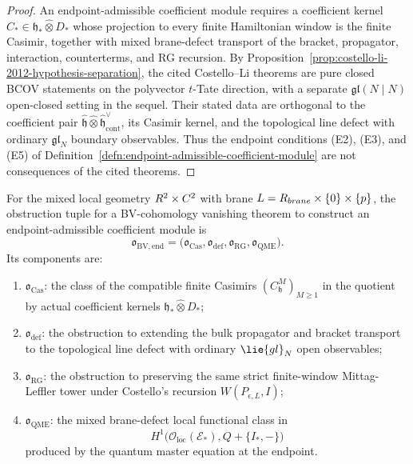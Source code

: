 \begin{proof}
  An endpoint-admissible coefficient module requires a coefficient
  kernel
  \(C_\ast\in\mathfrak h_\ast\widehat\otimes D_\ast\) whose projection
  to every finite Hamiltonian window is the finite Casimir, together
  with mixed brane-defect transport of the bracket, propagator,
  interaction, counterterms, and RG recursion.  By
  Proposition~\ref{prop:costello-li-2012-hypothesis-separation}, the cited
  Costello--Li theorems are pure closed BCOV statements on the
  polyvector \(t\)-Tate direction, with a separate
  \(\mathfrak{gl}(N\mid N)\) open-closed setting in the sequel.  Their
  stated data are orthogonal to the coefficient pair
  \(\widehat{\mathfrak h}\widehat\otimes
  \widehat{\mathfrak h}^{\vee}_{\mathrm{cont}}\), its Casimir kernel,
  and the topological line defect with ordinary \(\mathfrak{gl}_N\)
  boundary observables.  Thus the endpoint conditions (E2), (E3), and
  (E5) of
  Definition~\ref{defn:endpoint-admissible-coefficient-module} are not
  consequences of the cited theorems.
\end{proof}

\begin{defn}
\label{defn:bv-endpoint-obstruction-tuple}
  For the mixed local geometry
  \(R^2\times C^2\) with brane
  \(L=R_{brane}\times\{0\}\times\{p\}\), the obstruction
  tuple for a BV-cohomology vanishing theorem to construct an
  endpoint-admissible coefficient module is
  \[
    \mathfrak o_{\mathrm{BV,end}}
      =\bigl(
        \mathfrak o_{\mathrm{Cas}},
        \mathfrak o_{\mathrm{def}},
        \mathfrak o_{\mathrm{RG}},
        \mathfrak o_{\mathrm{QME}}
       \bigr).
  \]
  Its components are:
  \begin{enumerate}[label=(O\arabic*)]
    \item \(\mathfrak o_{\mathrm{Cas}}\): the class of the compatible
      finite Casimirs
      \((C^M_{\mathfrak h})_{M\geq1}\) in the quotient by actual
      coefficient kernels
      \(\mathfrak h_\ast\widehat\otimes D_\ast\);
    \item \(\mathfrak o_{\mathrm{def}}\): the obstruction to extending
      the bulk propagator and bracket transport to the topological line
      defect with ordinary \(\lie{gl}_N\) open observables;
    \item \(\mathfrak o_{\mathrm{RG}}\): the obstruction to preserving
      the same strict finite-window Mittag-Leffler tower under
      Costello's recursion \(W(P_{\epsilon,L},I)\);
    \item \(\mathfrak o_{\mathrm{QME}}\): the mixed brane-defect local
      functional class in
      \[
        H^1\bigl(\mathcal O_{\mathrm{loc}}(\mathcal E_\ast),
          Q+\{I_\ast,-\}\bigr)
      \]
      produced by the quantum master equation at the endpoint.
  \end{enumerate}
\end{defn}

